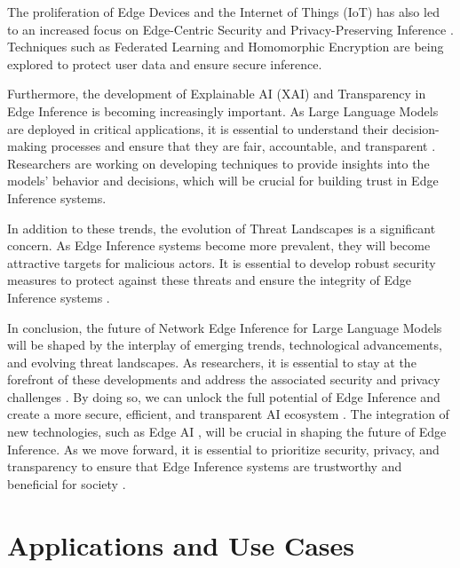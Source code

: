 \documentclass[11pt,a4paper]{article}
\begin{document}
The proliferation of Edge Devices and the Internet of Things (IoT) has also led to an increased focus on Edge-Centric Security \cite{doi:10.1109/compsac61105.2024.00206} and Privacy-Preserving Inference \cite{doi:10.56127/ijst.v3i3.1958}. Techniques such as Federated Learning \cite{doi:10.1145/3690624.3709335} and Homomorphic Encryption \cite{doi:10.1145/3642970.3655844} are being explored to protect user data and ensure secure inference.

Furthermore, the development of Explainable AI (XAI) and Transparency in Edge Inference \cite{arxiv:2409.00088} is becoming increasingly important. As Large Language Models are deployed in critical applications, it is essential to understand their decision-making processes and ensure that they are fair, accountable, and transparent \cite{arxiv:2504.07878}. Researchers are working on developing techniques to provide insights into the models' behavior and decisions, which will be crucial for building trust in Edge Inference systems.

In addition to these trends, the evolution of Threat Landscapes \cite{doi:10.1109/sp61157.2025.00160} is a significant concern. As Edge Inference systems become more prevalent, they will become attractive targets for malicious actors. It is essential to develop robust security measures to protect against these threats and ensure the integrity of Edge Inference systems \cite{doi:10.1145/3676536.3676741}.

In conclusion, the future of Network Edge Inference for Large Language Models will be shaped by the interplay of emerging trends, technological advancements, and evolving threat landscapes. As researchers, it is essential to stay at the forefront of these developments and address the associated security and privacy challenges \cite{doi:10.54097/jcb63r28}. By doing so, we can unlock the full potential of Edge Inference and create a more secure, efficient, and transparent AI ecosystem \cite{arxiv:2410.00531}. The integration of new technologies, such as Edge AI \cite{arxiv:2405.14371}, will be crucial in shaping the future of Edge Inference. As we move forward, it is essential to prioritize security, privacy, and transparency to ensure that Edge Inference systems are trustworthy and beneficial for society \cite{arxiv:2409.14961}.


\section{Applications and Use Cases}
\end{document}
